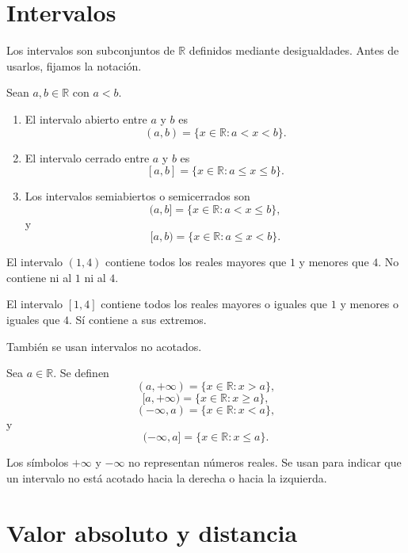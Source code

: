 \section{Intervalos}

Los intervalos son subconjuntos de \(\mathbb{R}\) definidos mediante desigualdades. Antes de usarlos, fijamos la notaci\'on.

\begin{definicion}
Sean \(a,b\in\mathbb{R}\) con \(a<b\).
\begin{enumerate}
  \item El intervalo abierto entre \(a\) y \(b\) es
  \[
    (a,b)=\{x\in\mathbb{R}: a<x<b\}.
  \]
  \item El intervalo cerrado entre \(a\) y \(b\) es
  \[
    [a,b]=\{x\in\mathbb{R}: a\leq x\leq b\}.
  \]
  \item Los intervalos semiabiertos o semicerrados son
  \[
    (a,b]=\{x\in\mathbb{R}: a<x\leq b\},
  \]
  y
  \[
    [a,b)=\{x\in\mathbb{R}: a\leq x<b\}.
  \]
\end{enumerate}
\end{definicion}

\begin{ejemplo}
El intervalo \((1,4)\) contiene todos los reales mayores que \(1\) y menores que \(4\). No contiene ni al \(1\) ni al \(4\).

El intervalo \([1,4]\) contiene todos los reales mayores o iguales que \(1\) y menores o iguales que \(4\). S\'i contiene a sus extremos.
\end{ejemplo}

Tambi\'en se usan intervalos no acotados.

\begin{definicion}
Sea \(a\in\mathbb{R}\). Se definen
\[
  (a,+\infty)=\{x\in\mathbb{R}:x>a\},
\]
\[
  [a,+\infty)=\{x\in\mathbb{R}:x\geq a\},
\]
\[
  (-\infty,a)=\{x\in\mathbb{R}:x<a\},
\]
y
\[
  (-\infty,a]=\{x\in\mathbb{R}:x\leq a\}.
\]
\end{definicion}

\begin{advertencia}
Los s\'imbolos \(+\infty\) y \(-\infty\) no representan n\'umeros reales. Se usan para indicar que un intervalo no est\'a acotado hacia la derecha o hacia la izquierda.
\end{advertencia}

\section{Valor absoluto y distancia}


